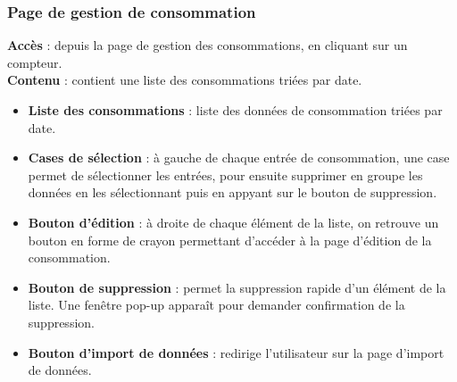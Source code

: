 \documentclass[../rapport.tex]{subfiles}
\begin{document}
\subsubsection{Page de gestion de consommation}
\noindent \textbf{Accès} :  depuis la page de gestion des consommations, en cliquant sur un compteur.\\
\textbf{Contenu }: contient une liste des consommations triées par date. 
\begin{itemize}
    \item \textbf{Liste des consommations} : liste des données de consommation triées par date. 
    \item \textbf{Cases de sélection} : à gauche de chaque entrée de consommation, une case permet de sélectionner les entrées, pour ensuite supprimer en groupe les données en les sélectionnant puis en appyant sur le bouton de suppression.
    \item \textbf{Bouton d'édition} : à droite de chaque élément de la liste, on retrouve un bouton en forme de crayon permettant d'accéder à la page d'édition de la consommation. 
    \item \textbf{Bouton de suppression} : permet la suppression rapide d'un élément de la liste. Une fenêtre pop-up apparaît pour demander confirmation de la suppression.
    \item \textbf{Bouton d'import de données} : redirige l'utilisateur sur la page d'import de données.
\end{itemize}
\end{document}
